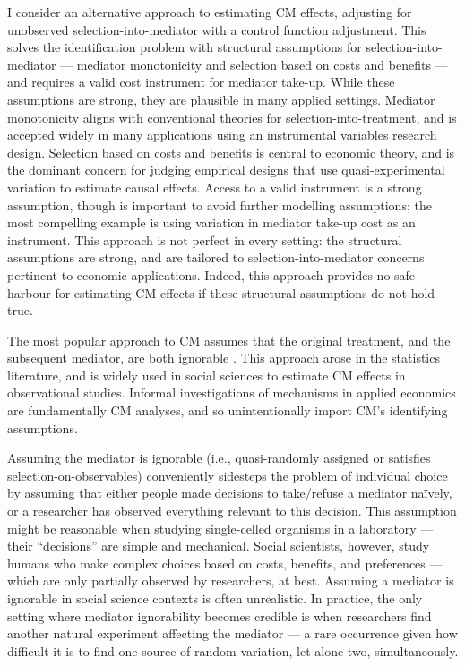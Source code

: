 I consider an alternative approach to estimating CM effects, adjusting for unobserved selection-into-mediator with a control function adjustment.
This solves the identification problem with structural assumptions for selection-into-mediator --- mediator monotonicity and selection based on costs and benefits --- and requires a valid cost instrument for mediator take-up.
While these assumptions are strong, they are plausible in many applied settings.
Mediator monotonicity aligns with conventional theories for selection-into-treatment, and is accepted widely in many applications using an instrumental variables research design.
Selection based on costs and benefits is central to economic theory, and is the dominant concern for judging empirical designs that use quasi-experimental variation to estimate causal effects.
Access to a valid instrument is a strong assumption, though is important to avoid further modelling assumptions; the most compelling example is using variation in mediator take-up cost as an instrument.
This approach is not perfect in every setting: the structural assumptions are strong, and are tailored to selection-into-mediator concerns pertinent to economic applications.
Indeed, this approach provides no safe harbour for estimating CM effects if these structural assumptions do not hold true.

The most popular approach to CM assumes that the original treatment, and the subsequent mediator, are both ignorable \citep{imai2010identification}.
This approach arose in the statistics literature, and is widely used in social sciences to estimate CM effects in observational studies.
Informal investigations of mechanisms in applied economics are fundamentally CM analyses, and so unintentionally import CM's identifying assumptions.

Assuming the mediator is ignorable (i.e., quasi-randomly assigned or satisfies selection-on-observables) 
conveniently sidesteps the problem of individual choice by assuming that either people made decisions to take/refuse a mediator na\"ively, or a researcher has observed everything relevant to this decision.
This assumption might be reasonable when studying single-celled organisms in a laboratory --- their ``decisions'' are simple and mechanical.
Social scientists, however, study humans who make complex choices based on costs, benefits, and preferences --- which are only partially observed by researchers, at best.
Assuming a mediator is ignorable in social science contexts is often unrealistic.
In practice, the only setting where mediator ignorability becomes credible is when researchers find another natural experiment affecting the mediator --- a rare occurrence given how difficult it is to find one source of random variation, let alone two, simultaneously.


